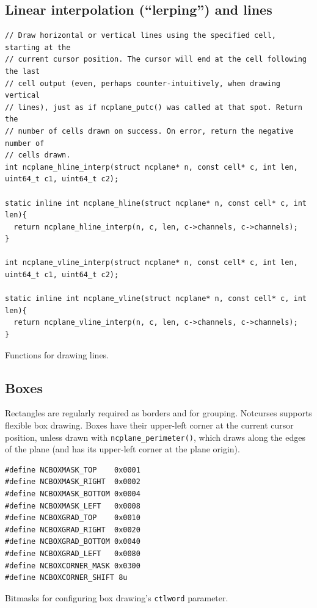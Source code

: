 \documentclass[letterpaper,10pt]{article}
\begin{document}
\subsection{Linear interpolation (``lerping'') and lines}
\label{sec:lerps}
\begin{listing}[!htbp]
\begin{verbatim}
// Draw horizontal or vertical lines using the specified cell, starting at the
// current cursor position. The cursor will end at the cell following the last
// cell output (even, perhaps counter-intuitively, when drawing vertical
// lines), just as if ncplane_putc() was called at that spot. Return the
// number of cells drawn on success. On error, return the negative number of
// cells drawn.
int ncplane_hline_interp(struct ncplane* n, const cell* c, int len, uint64_t c1, uint64_t c2);

static inline int ncplane_hline(struct ncplane* n, const cell* c, int len){
  return ncplane_hline_interp(n, c, len, c->channels, c->channels);
}

int ncplane_vline_interp(struct ncplane* n, const cell* c, int len, uint64_t c1, uint64_t c2);

static inline int ncplane_vline(struct ncplane* n, const cell* c, int len){
  return ncplane_vline_interp(n, c, len, c->channels, c->channels);
}
\end{verbatim}
\caption{Functions for drawing lines.}
\label{list:lines}
\end{listing}

\subsection{Boxes}
\label{sec:boxes}
Rectangles are regularly required as borders and for grouping. Notcurses supports
flexible box drawing. Boxes have their upper-left corner at the current cursor
position, unless drawn with \texttt{ncplane\_perimeter()}, which draws along the
edges of the plane (and has its upper-left corner at the plane origin).

\begin{listing}[!htbp]
\begin{verbatim}
#define NCBOXMASK_TOP    0x0001
#define NCBOXMASK_RIGHT  0x0002
#define NCBOXMASK_BOTTOM 0x0004
#define NCBOXMASK_LEFT   0x0008
#define NCBOXGRAD_TOP    0x0010
#define NCBOXGRAD_RIGHT  0x0020
#define NCBOXGRAD_BOTTOM 0x0040
#define NCBOXGRAD_LEFT   0x0080
#define NCBOXCORNER_MASK 0x0300
#define NCBOXCORNER_SHIFT 8u
\end{verbatim}
\caption{Bitmasks for configuring box drawing's \texttt{ctlword} parameter.}
\label{list:boxbitmasks}
\end{listing}
\end{document}
